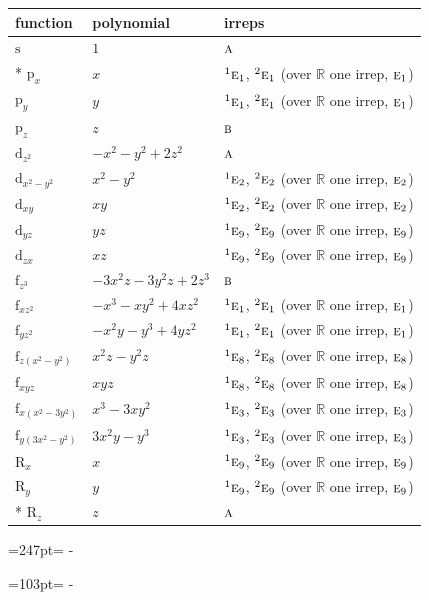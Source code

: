\documentclass[10pt,a4paper]{article}
\newcommand{\needspace}[1]{\par\penalty-100\begingroup\dimen0=#1\relax\dimen2=\pagegoal
  \advance\dimen2-\pagetotal\ifdim\dimen0>\dimen2\relax\ifdim\dimen2>0pt\vfil\break\fi\fi
  \endgroup}
\numberwithin{equation}{section}
\newcommand{\irr}[1]{\text{\normalfont\scshape #1}}
\newcommand{\conjpair}[1]{{}^{#1}}
\newcommand{\orbital}[1]{\mathrm{#1}}
\begin{document}
{\small\begin{longtable}{@{}lll@{}}\toprule
function & polynomial & irreps\\\midrule\endhead
\bottomrule\endfoot\endlastfoot
$\orbital{s}$ & $1$ & $\irr{a}$\\*
$\orbital{p}_{x}$ & $x$ & $\conjpair{1}\irr{e}_{1}$, $\conjpair{2}\irr{e}_{1}$ (over $\mathbb{R}$ one irrep, $\irr{e}_{1}$)\\
$\orbital{p}_{y}$ & $y$ & $\conjpair{1}\irr{e}_{1}$, $\conjpair{2}\irr{e}_{1}$ (over $\mathbb{R}$ one irrep, $\irr{e}_{1}$)\\
$\orbital{p}_{z}$ & $z$ & $\irr{b}$\\
$\orbital{d}_{z^2}$ & $-x^{2} - y^{2} + 2z^{2}$ & $\irr{a}$\\
$\orbital{d}_{x^2-y^2}$ & $x^{2} - y^{2}$ & $\conjpair{1}\irr{e}_{2}$, $\conjpair{2}\irr{e}_{2}$ (over $\mathbb{R}$ one irrep, $\irr{e}_{2}$)\\
$\orbital{d}_{xy}$ & $xy$ & $\conjpair{1}\irr{e}_{2}$, $\conjpair{2}\irr{e}_{2}$ (over $\mathbb{R}$ one irrep, $\irr{e}_{2}$)\\
$\orbital{d}_{yz}$ & $yz$ & $\conjpair{1}\irr{e}_{9}$, $\conjpair{2}\irr{e}_{9}$ (over $\mathbb{R}$ one irrep, $\irr{e}_{9}$)\\
$\orbital{d}_{zx}$ & $xz$ & $\conjpair{1}\irr{e}_{9}$, $\conjpair{2}\irr{e}_{9}$ (over $\mathbb{R}$ one irrep, $\irr{e}_{9}$)\\
$\orbital{f}_{z^3}$ & $-3x^{2}z - 3y^{2}z + 2z^{3}$ & $\irr{b}$\\
$\orbital{f}_{xz^2}$ & $-x^{3} - xy^{2} + 4xz^{2}$ & $\conjpair{1}\irr{e}_{1}$, $\conjpair{2}\irr{e}_{1}$ (over $\mathbb{R}$ one irrep, $\irr{e}_{1}$)\\
$\orbital{f}_{yz^2}$ & $-x^{2}y - y^{3} + 4yz^{2}$ & $\conjpair{1}\irr{e}_{1}$, $\conjpair{2}\irr{e}_{1}$ (over $\mathbb{R}$ one irrep, $\irr{e}_{1}$)\\
$\orbital{f}_{z(x^2-y^2)}$ & $x^{2}z - y^{2}z$ & $\conjpair{1}\irr{e}_{8}$, $\conjpair{2}\irr{e}_{8}$ (over $\mathbb{R}$ one irrep, $\irr{e}_{8}$)\\
$\orbital{f}_{xyz}$ & $xyz$ & $\conjpair{1}\irr{e}_{8}$, $\conjpair{2}\irr{e}_{8}$ (over $\mathbb{R}$ one irrep, $\irr{e}_{8}$)\\
$\orbital{f}_{x(x^2-3y^2)}$ & $x^{3} - 3xy^{2}$ & $\conjpair{1}\irr{e}_{3}$, $\conjpair{2}\irr{e}_{3}$ (over $\mathbb{R}$ one irrep, $\irr{e}_{3}$)\\
$\orbital{f}_{y(3x^2-y^2)}$ & $3x^{2}y - y^{3}$ & $\conjpair{1}\irr{e}_{3}$, $\conjpair{2}\irr{e}_{3}$ (over $\mathbb{R}$ one irrep, $\irr{e}_{3}$)\\
$\orbital{R}_{x}$ & $x$ & $\conjpair{1}\irr{e}_{9}$, $\conjpair{2}\irr{e}_{9}$ (over $\mathbb{R}$ one irrep, $\irr{e}_{9}$)\\
$\orbital{R}_{y}$ & $y$ & $\conjpair{1}\irr{e}_{9}$, $\conjpair{2}\irr{e}_{9}$ (over $\mathbb{R}$ one irrep, $\irr{e}_{9}$)\\*
$\orbital{R}_{z}$ & $z$ & $\irr{a}$\\
\bottomrule\end{longtable}}
\needspace{247pt}
\needspace{103pt}
\end{document}
